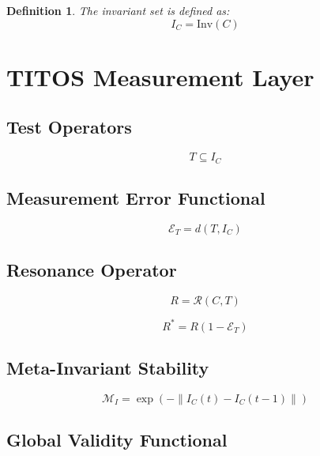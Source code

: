 \documentclass[conference]{IEEEtran}
\newtheorem{definition}{Definition}
\begin{document}
\begin{definition}
The invariant set is defined as:
\begin{equation}
I_C = \mathrm{Inv}(C)
\end{equation}
\end{definition}

\section{TITOS Measurement Layer}

\subsection{Test Operators}

\begin{equation}
T \subseteq I_C
\end{equation}

\subsection{Measurement Error Functional}

\begin{equation}
\mathcal{E}_T = d(T, I_C)
\end{equation}

\subsection{Resonance Operator}

\begin{equation}
R = \mathcal{R}(C, T)
\end{equation}

\begin{equation}
R^* = R(1 - \mathcal{E}_T)
\end{equation}

\subsection{Meta-Invariant Stability}

\begin{equation}
\mathcal{M}_I = \exp(-\|I_C(t) - I_C(t-1)\|)
\end{equation}

\subsection{Global Validity Functional}
\end{document}
